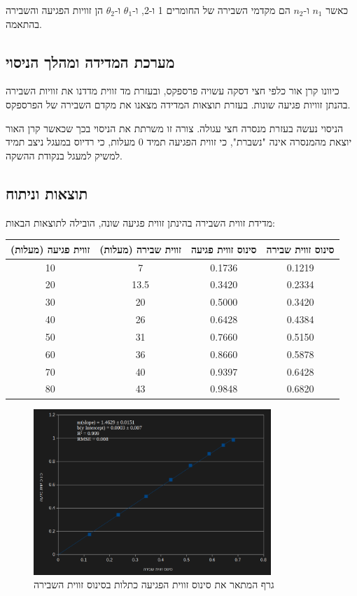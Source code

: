 \documentclass[14pt]{extarticle}
\begin{document}
כאשר $n_1$ ו-$n_2$ הם מקדמי השבירה של החומרים 1 ו-2, ו-$\theta_1$ ו-$\theta_2$ הן זוויות הפגיעה והשבירה בהתאמה.

\subsection*{מערכת המדידה ומהלך הניסוי}

כיוונו קרן אור כלפי חצי דסקה עשויה פרספקס, ובעזרת מד זווית מדדנו את זוויות השבירה בהנתן זוויות פגיעה שונות. בעזרת תוצאות המדידה מצאנו את מקדם השבירה של הפרספקס.

הניסוי נעשה בעזרת מנסרה חצי עגולה. צורה זו משרתת את הניסוי בכך שכאשר קרן האור יוצאת מהמנסרה אינה "נשברת", כי זווית הפגיעה תמיד 0 מעלות, כי רדיוס במעגל ניצב תמיד למשיק למעגל בנקודת ההשקה.

\subsection*{תוצאות וניתוח}

מדידת זווית השבירה בהינתן זווית פגיעה שונה, הובילה לתוצאות הבאות:
\begin{center}
    {\small
    \begin{tabular}{|c|c|c|c|}
    \hline
    זווית פגיעה (מעלות) & זווית שבירה (מעלות) & סינוס זווית פגיעה & סינוס זווית שבירה \\ \hline
    10 & 7   & 0.1736 & 0.1219 \\ \hline
    20 & 13.5 & 0.3420 & 0.2334 \\ \hline
    30 & 20  & 0.5000 & 0.3420 \\ \hline
    40 & 26  & 0.6428 & 0.4384 \\ \hline
    50 & 31  & 0.7660 & 0.5150 \\ \hline
    60 & 36  & 0.8660 & 0.5878 \\ \hline
    70 & 40  & 0.9397 & 0.6428 \\ \hline
    80 & 43  & 0.9848 & 0.6820 \\ \hline
    \end{tabular}
    }
\end{center}

\begin{figure}[ht]
  \centering
  \includegraphics[width=0.8\textwidth]{Lab_1_Experiment_1.png}
  \caption{גרף המתאר את סינוס זווית הפגיעה כתלות בסינוס זווית השבירה}
  \label{fig:excel_chart}
\end{figure}
\end{document}
